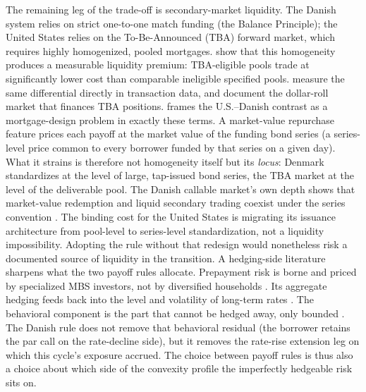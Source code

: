 \documentclass[12pt]{article}
\begin{document}
The remaining leg of the trade-off is secondary-market liquidity. The Danish system relies on strict one-to-one match funding (the Balance Principle); the United States relies on the To-Be-Announced (TBA) forward market, which requires highly homogenized, pooled mortgages. \citet{vickery2013} show that this homogeneity produces a measurable liquidity premium: TBA-eligible pools trade at significantly lower cost than comparable ineligible specified pools. \citet{gao2017} measure the same differential directly in transaction data, and \citet{song2019} document the dollar-roll market that finances TBA positions. \citet{campbell2013} frames the U.S.--Danish contrast as a mortgage-design problem in exactly these terms. A market-value repurchase feature prices each payoff at the market value of the funding bond series (a series-level price common to every borrower funded by that series on a given day). What it strains is therefore not homogeneity itself but its \emph{locus}: Denmark standardizes at the level of large, tap-issued bond series, the TBA market at the level of the deliverable pool. The Danish callable market's own depth shows that market-value redemption and liquid secondary trading coexist under the series convention \citep{berg2018}. The binding cost for the United States is migrating its issuance architecture from pool-level to series-level standardization, not a liquidity impossibility. Adopting the rule without that redesign would nonetheless risk a documented source of liquidity in the transition. A hedging-side literature sharpens what the two payoff rules allocate. Prepayment risk is borne and priced by specialized MBS investors, not by diversified households \citep{gabaix2007}. Its aggregate hedging feeds back into the level and volatility of long-term rates \citep{malkhozov2016}. The behavioral component is the part that cannot be hedged away, only bounded \citep{perotti2024}. The Danish rule does not remove that behavioral residual (the borrower retains the par call on the rate-decline side), but it removes the rate-rise extension leg on which this cycle's exposure accrued. The choice between payoff rules is thus also a choice about which side of the convexity profile the imperfectly hedgeable risk sits on.
\end{document}
